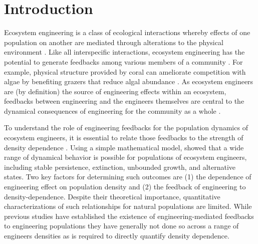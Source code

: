 \section*{Introduction}

Ecosystem engineering is a class of ecological interactions whereby effects of one
population on another are mediated through alterations to the physical environment
\citep{jones1994, wilby2002}.
Like all interspecific interactions, 
ecosystem engineering has the potential to generate feedbacks among various 
members of a community \citep{largaespada2012,donadi2014,sanders2014}.
For example, physical structure provided by coral can ameliorate competition with algae by
benefiting grazers that reduce algal abundance \citep{bozec2013}. 
As ecosystem engineers are (by definition) the source of engineering effects within
an ecosystem, 
feedbacks between engineering and the engineers themselves
are central to the dynamical consequences of engineering for the 
community as a whole \citep{hastings2007, sanders2014}. 

To understand the role of engineering feedbacks
for the population dynamics of ecosystem engineers,
it is essential to relate those feedbacks to the strength of density dependence
\citep{hastings2007, cuddington2009}.
Using a simple mathematical model,
\cite{cuddington2009} showed that a wide range of dynamical behavior
is possible for populations of ecosystem engineers,
including stable persistence, extinction, unbounded growth, and alternative states.
Two key factors for determining such outcomes are 
(1) the dependence of engineering effect on population density and 
(2) the feedback of engineering to density-dependence.
Despite their theoretical importance,
quantitative characterizations of such relationships for natural populations are limited.
While previous studies have established the existence of engineering-mediated feedbacks
to engineering populations \citep[e.g.,][]{bozec2013, donadi2014, largaespada2012}
they have generally not done so across a range of engineers densities 
as is required to directly quantify density dependence.
 
